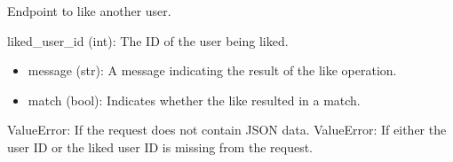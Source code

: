 \documentclass[letterpaper,10pt,english]{sphinxmanual}
\begin{document}

\begin{fulllineitems}
\label{\detokenize{routes.feed:routes.feed.routes.like}}
\pysigstartsignatures
{}
\pysigstopsignatures
\sphinxAtStartPar
Endpoint to like another user.
\begin{description}
\sphinxAtStartPar
liked\_user\_id (int): The ID of the user being liked.

\begin{description}
\begin{itemize}
\item {} 
\sphinxAtStartPar
message (str): A message indicating the result of the like operation.

\item {} 
\sphinxAtStartPar
match (bool): Indicates whether the like resulted in a match.

\end{itemize}

\end{description}

\sphinxAtStartPar
ValueError: If the request does not contain JSON data.
ValueError: If either the user ID or the liked user ID is missing from the request.

\end{description}

\end{fulllineitems}

\end{document}
